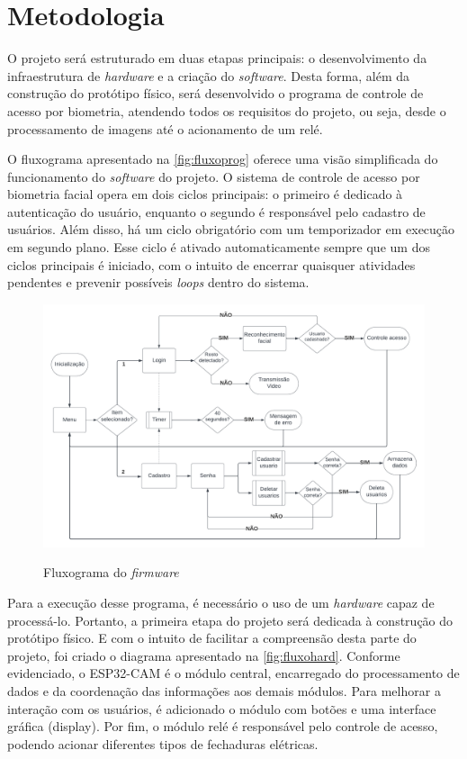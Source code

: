 
\chapter{Metodologia}\label{cap:materialemetodos}

O projeto será estruturado em duas etapas principais: o desenvolvimento da
infraestrutura de \textit{hardware} e a criação do \textit{software}.
Desta forma, além da construção do protótipo físico, será desenvolvido
o programa de controle de acesso por biometria, atendendo todos
os requisitos do projeto, ou seja, desde o processamento de imagens
até o acionamento de um relé.

O fluxograma apresentado na \autoref{fig:fluxoprog} oferece uma visão
simplificada do funcionamento do \textit{software} do projeto. O sistema
de controle de acesso por biometria facial opera em dois ciclos principais:
o primeiro é dedicado à autenticação do usuário, enquanto o segundo é responsável
pelo cadastro de usuários. Além disso, há um ciclo obrigatório com um
temporizador em execução em segundo plano. Esse ciclo é ativado
automaticamente sempre que um dos ciclos principais é iniciado, com o intuito
de encerrar quaisquer atividades pendentes e prevenir possíveis \textit{loops}
dentro do sistema.

\begin{figure}[h!]
    \centering
    \caption{Fluxograma do \textit{firmware}}
    \includegraphics[scale=0.25]{figuras/fluxo_app.png}
    \fonte{}%
    \label{fig:fluxoprog}
    \centering
\end{figure}

Para a execução desse programa, é necessário o uso de um \textit{hardware}
capaz de processá-lo. Portanto, a primeira etapa do projeto será dedicada à
construção do protótipo físico. E com o intuito de facilitar a compreensão desta
parte do projeto, foi criado o diagrama apresentado na \autoref{fig:fluxohard}.
Conforme evidenciado, o ESP32-CAM é o módulo central, encarregado do
processamento de dados e da coordenação das informações aos demais módulos.
Para melhorar a interação com os usuários, é adicionado o módulo com botões e
uma interface gráfica (display). Por fim, o módulo relé é
responsável pelo controle de acesso, podendo acionar diferentes tipos de
fechaduras elétricas.

